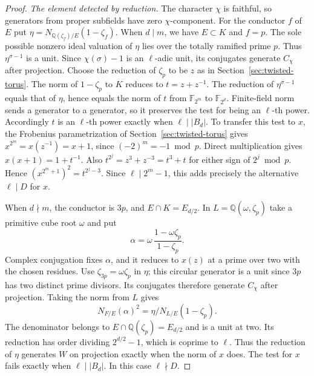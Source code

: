 \documentclass[11pt]{article}
\begin{document}
\begin{proof}
\emph{The element detected by reduction.}
The character \(\chi\) is faithful, so generators from proper
subfields have zero \(\chi\)-component. For the conductor \(f\)
of \(E\) put \(\eta=N_{\mathbb Q(\zeta_f)/E}(1-\zeta_f)\).
When \(d\mid m\), we have \(E\subset K\) and \(f=p\).
The sole possible nonzero ideal valuation of \(\eta\) lies over
the totally ramified prime \(p\). Thus \(\eta^{\sigma-1}\) is a
unit. Since \(\chi(\sigma)-1\) is an \(\ell\)-adic unit,
its conjugates generate \(C_\chi\) after projection.
Choose the reduction of \(\zeta_p\) to be \(z\) as in
Section~\ref{sec:twisted-torus}. The norm of \(1-\zeta_p\) to
\(K\) reduces to \(t=z+z^{-1}\). The reduction of
\(\eta^{\sigma-1}\) equals that of \(\eta\), hence equals the norm
of \(t\) from \(\mathbb F_{2^m}\) to \(\mathbb F_{2^d}\).
Finite-field norm sends a generator to a generator, so it preserves
the test for being an \(\ell\)-th power. Accordingly \(t\) is an
\(\ell\)-th power exactly when \(\ell\mid |B_d|\).
To transfer this test to \(x\), the Frobenius parametrization of
Section~\ref{sec:twisted-torus} gives \(x^{2^m}=x(z^{-1})=x+1\),
since \((-2)^m=-1\bmod p\). Direct multiplication gives
\(x(x+1)=1+t^{-1}\). Also \(t^{2^j}=z^3+z^{-3}=t^3+t\) for
either sign of \(2^j\bmod p\). Hence
\((x^{2^m+1})^2=t^{2^j-3}\). Since \(\ell\mid2^m-1\), this adds
precisely the alternative \(\ell\mid D\) for \(x\).

When \(d\nmid m\), the conductor is \(3p\), and \(E\cap K=E_{d/2}\).
In \(L=\mathbb Q(\omega,\zeta_p)\) take a primitive cube root
\(\omega\) and put
\[
                  \alpha=\omega\,\frac{1-\omega\zeta_p}{1-\zeta_p}.
\]
Complex conjugation fixes \(\alpha\), and it reduces to \(x(z)\)
at a prime over two with the chosen residues. Use
\(\zeta_{3p}=\omega\zeta_p\) in \(\eta\); this circular generator
is a unit since \(3p\) has two distinct prime divisors.
Its conjugates therefore generate \(C_\chi\) after projection.
Taking the norm from \(L\) gives
\[
       N_{F/E}(\alpha)^2
             =\eta/N_{L/E}(1-\zeta_p).
\]
The denominator belongs to \(E\cap\mathbb Q(\zeta_p)=E_{d/2}\)
and is a unit at two. Its reduction has order dividing
\(2^{d/2}-1\), which is coprime to \(\ell\). Thus the reduction of
\(\eta\) generates \(W\) on projection exactly when the norm of
\(x\) does. The test for \(x\) fails exactly when \(\ell\mid |B_d|\).
In this case \(\ell\nmid D\).


\end{proof}
\end{document}
